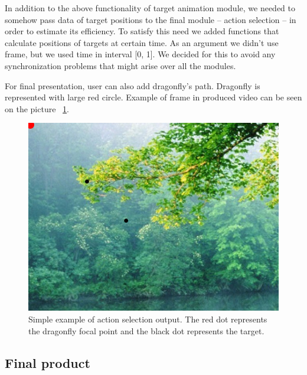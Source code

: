 \documentclass[hidelinks,a4paper,11pt]{article}
\begin{document}
In addition to the above functionality of target animation module, we needed to somehow pass data of target positions to the final module – action selection – in order to estimate its efficiency. To satisfy this need we added functions that calculate positions of targets at certain time. As an argument we didn't use frame, but we used time in interval [0, 1]. We decided for this to avoid any synchronization problems that might arise over all the modules.

For final presentation, user can also add dragonfly's path. Dragonfly is represented with large red circle.
Example of frame in produced video can be seen on the picture  ~\ref{target_animation_example}.

\begin{figure}[hb]
\centering
\includegraphics[scale = 0.3]{example}
\caption{Simple example of action selection output. The red dot represents the dragonfly focal point and the black dot represents the target.}
\label{target_animation_example}
\end{figure}

\newpage

\subsection{Final product}



\end{document}
